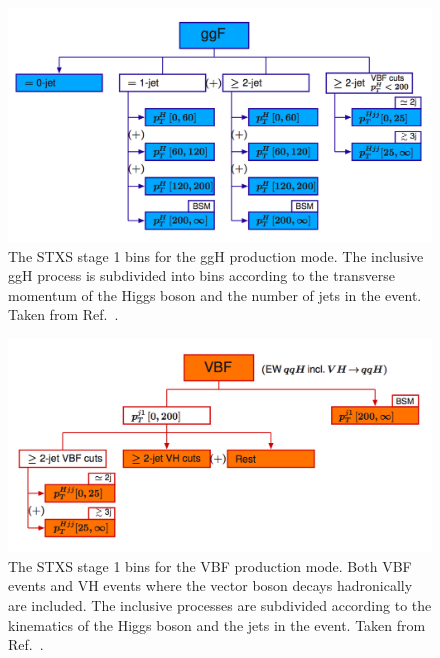 \begin{figure}[hptb]
  \centering
  \includegraphics[width=\textwidth]{Figures/Theory/stage1ggH.png}
  \caption[Stage 1 STXS bins for the ggH production mode.]
  {
    The STXS stage 1 bins for the ggH production mode.
    The inclusive ggH process is subdivided into bins according to the transverse momentum 
    of the Higgs boson and the number of jets in the event.
    Taken from Ref.~\cite{YR4}.
  }
  \label{fig:theory_stage1ggH}
\end{figure}

\begin{figure}[hptb]
  \centering
  \includegraphics[width=\textwidth]{Figures/Theory/stage1VBF.png}
  \caption[Stage 1 STXS bins for the VBF production mode.]
  {
    The STXS stage 1 bins for the VBF production mode.
    Both VBF events and VH events where the vector boson decays hadronically are included.
    The inclusive processes are subdivided according to the kinematics of the Higgs boson 
    and the jets in the event.
    Taken from Ref.~\cite{YR4}.
  }
  \label{fig:theory_stage1VBF}
\end{figure}
